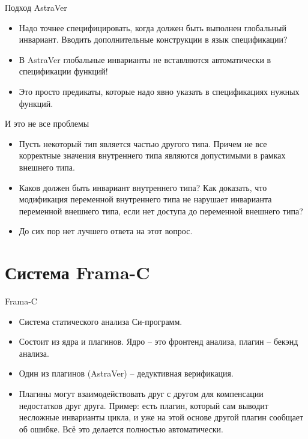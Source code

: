 \documentclass[hyperref={unicode=true}]{beamer}
\begin{document}
    \begin{frame}{Подход AstraVer}
    \begin{itemize}
    \item
    Надо точнее специфицировать, когда должен быть
    выполнен глобальный инвариант. Вводить дополнительные
    конструкции в язык спецификации?
    \item
    В AstraVer глобальные инварианты не
    вставляются автоматически в спецификации функций!
    \item
    Это просто предикаты, которые надо явно
    указать в спецификациях нужных функций.
    \end{itemize}
    \end{frame}

    \begin{frame}{И это не все проблемы}
    \begin{itemize}
    \item
    Пусть некоторый тип является частью другого типа.
    Причем не все корректные значения внутреннего
    типа являются допустимыми в рамках внешнего типа.
    \item
    Каков должен быть инвариант внутреннего типа?
    Как доказать, что модификация переменной
    внутреннего типа не нарушает инварианта
    переменной внешнего типа, если нет доступа
    до переменной внешнего типа?
    \item
    До сих пор нет лучшего ответа на этот вопрос.
    \end{itemize}
    \end{frame}

    \section{Система Frama-C}

    \begin{frame}{Frama-C}
    \begin{itemize}
    \item Система статического анализа Си-программ.
    \item Состоит из ядра и плагинов. Ядро -- это фронтенд
    анализа, плагин -- бекэнд анализа.
    \item Один из плагинов (AstraVer) -- дедуктивная верификация.
    \item Плагины могут взаимодействовать друг с другом
    для компенсации недостатков друг друга. Пример:
    есть плагин, который сам выводит несложные инварианты цикла,
    и уже на этой основе другой плагин сообщает об ошибке.
    Всё это делается полностью автоматически.
    \end{itemize}
    \end{frame}
\end{document}
